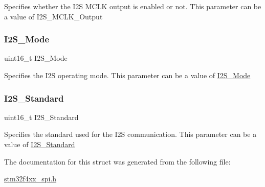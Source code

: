 Specifies whether the I2S M\+C\+LK output is enabled or not. This parameter can be a value of I2\+S\+\_\+\+M\+C\+L\+K\+\_\+\+Output \mbox{\label{struct_i2_s___init_type_def_ab239a97360862b2514410fef774686f5}} 
\subsubsection{\texorpdfstring{I2\+S\+\_\+\+Mode}{I2S\_Mode}}
{\footnotesize\ttfamily uint16\+\_\+t I2\+S\+\_\+\+Mode}

Specifies the I2S operating mode. This parameter can be a value of \mbox{\hyperlink{struct_i2_s___init_type_def_ab239a97360862b2514410fef774686f5}{I2\+S\+\_\+\+Mode}} \mbox{\label{struct_i2_s___init_type_def_a0f0c02142c68e2c2f0038ca79bdbd365}} 
\subsubsection{\texorpdfstring{I2\+S\+\_\+\+Standard}{I2S\_Standard}}
{\footnotesize\ttfamily uint16\+\_\+t I2\+S\+\_\+\+Standard}

Specifies the standard used for the I2S communication. This parameter can be a value of \mbox{\hyperlink{struct_i2_s___init_type_def_a0f0c02142c68e2c2f0038ca79bdbd365}{I2\+S\+\_\+\+Standard}} 

The documentation for this struct was generated from the following file\+:\begin{DoxyCompactItemize}
\item 
\mbox{\hyperlink{stm32f4xx__spi_8h}{stm32f4xx\+\_\+spi.\+h}}\end{DoxyCompactItemize}
